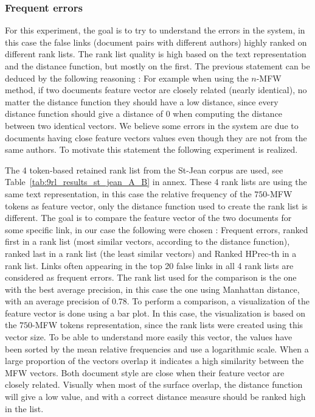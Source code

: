 \subsubsection{Frequent errors}
\label{sec:frequent_errors}

For this experiment, the goal is to try to understand the errors in the system, in this case the false links (document pairs with different authors) highly ranked on different rank lists.
The rank list quality is high based on the text representation and the distance function, but mostly on the first.
The previous statement can be deduced by the following reasoning : For example when using the $n$-MFW method, if two documents feature vector are closely related (nearly identical), no matter the distance function they should have a low distance, since every distance function should give a distance of 0 when computing the distance between two identical vectors.
We believe some errors in the system are due to documents having close feature vectors values even though they are not from the same authors.
To motivate this statement the following experiment is realized.

The 4 token-based retained rank list from the St-Jean corpus are used, see Table~\ref{tab:9rl_results_st_jean_A_B} in annex.
These 4 rank lists are using the same text representation, in this case the relative frequency of the $750$-MFW tokens as feature vector, only the distance function used to create the rank list is different.
The goal is to compare the feature vector of the two documents for some specific link, in our case the following were chosen : Frequent errors, ranked first in a rank list (most similar vectors, according to the distance function), ranked last in a rank list (the least similar vectors) and Ranked HPrec-th in a rank list.
Links often appearing in the top 20 false links in all 4 rank lists are considered as frequent errors.
The rank list used for the comparison is the one with the best average precision, in this case the one using Manhattan distance, with an average precision of 0.78.
To perform a comparison, a visualization of the feature vector is done using a bar plot.
In this case, the visualization is based on the $750$-MFW tokens representation, since the rank lists were created using this vector size.
To be able to understand more easily this vector, the values have been sorted by the mean relative frequencies and use a logarithmic scale.
When a large proportion of the vectors overlap it indicates a high similarity between the MFW vectors.
Both document style are close when their feature vector are closely related.
Visually when most of the surface overlap, the distance function will give a low value, and with a correct distance measure should be ranked high in the list.

